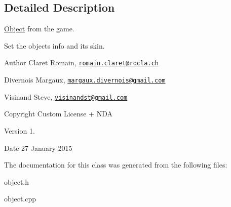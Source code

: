 \subsection{Detailed Description}
\hyperlink{class_object}{Object} from the game. 

Set the object\textquotesingle{}s info and its skin. \begin{DoxyAuthor}{Author}
Claret Romain, \href{mailto:romain.claret@rocla.ch}{\tt romain.\+claret@rocla.\+ch} 

Divernois Margaux, \href{mailto:margaux.divernois@gmail.com}{\tt margaux.\+divernois@gmail.\+com} 

Visinand Steve, \href{mailto:visinandst@gmail.com}{\tt visinandst@gmail.\+com} 
\end{DoxyAuthor}
\begin{DoxyCopyright}{Copyright}
Custom License + N\+D\+A 
\end{DoxyCopyright}
\begin{DoxyVersion}{Version}
1. 
\end{DoxyVersion}
\begin{DoxyDate}{Date}
27 January 2015 
\end{DoxyDate}


The documentation for this class was generated from the following files\+:\begin{DoxyCompactItemize}
\item 
object.\+h\item 
object.\+cpp\end{DoxyCompactItemize}
